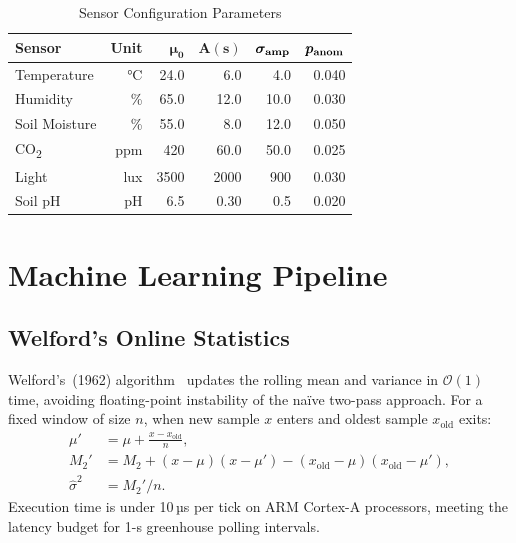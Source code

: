 \documentclass[journal,10pt,twocolumn]{IEEEtran}
\begin{document}
\begin{table}[t]
\caption{Sensor Configuration Parameters}
\label{tab:sensors}
\centering
\footnotesize
\setlength\tabcolsep{3pt}
\begin{tabular}{lrrrrr}
\toprule
\textbf{Sensor}     & \textbf{Unit}
  & $\boldsymbol{\mu_0}$ & $\boldsymbol{A(s)}$
  & $\boldsymbol{\sigma_{\rm amp}}$ & $\boldsymbol{p_{\rm anom}}$\\
\midrule
Temperature         & °C    & 24.0 & 6.0  & 4.0  & 0.040\\
Humidity            & \%    & 65.0 & 12.0 & 10.0 & 0.030\\
Soil Moisture       & \%    & 55.0 & 8.0  & 12.0 & 0.050\\
CO\textsubscript{2} & ppm   & 420  & 60.0 & 50.0 & 0.025\\
Light               & lux   & 3500 & 2000 & 900  & 0.030\\
Soil pH             & pH    & 6.5  & 0.30 & 0.5  & 0.020\\
\bottomrule
\end{tabular}
\end{table}

\section{Machine Learning Pipeline}
\label{sec:ml}

\subsection{Welford's Online Statistics}

Welford's~(1962) algorithm~\cite{Welford1962} updates the rolling mean
and variance in $\mathcal{O}(1)$ time, avoiding floating-point
instability of the naïve two-pass approach.
For a fixed window of size $n$, when new sample $x$ enters and oldest
sample $x_{\mathrm{old}}$ exits:
\begin{align}
  \mu' &= \mu + \tfrac{x - x_{\mathrm{old}}}{n}, \label{eq:welf_mu}\\
  M_2' &= M_2
    + (x-\mu)(x-\mu')
    - (x_{\mathrm{old}}-\mu)(x_{\mathrm{old}}-\mu'),\label{eq:welf_m2}\\
  \hat\sigma^2 &= M_2'/n. \label{eq:welf_var}
\end{align}
Execution time is under 10\,µs per tick on ARM Cortex-A processors,
meeting the latency budget for 1-s greenhouse polling intervals.
\end{document}
